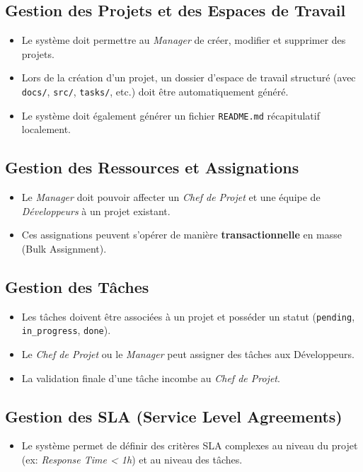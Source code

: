 \subsection{Gestion des Projets et des Espaces de Travail}
\begin{itemize}[leftmargin=*]
    \item Le syst\`{e}me doit permettre au \textit{Manager} de cr\'{e}er, modifier et supprimer des projets.
    \item Lors de la cr\'{e}ation d'un projet, un dossier d'espace de travail structur\'{e}
    (avec \texttt{docs/}, \texttt{src/}, \texttt{tasks/}, etc.) doit \^{e}tre automatiquement g\'{e}n\'{e}r\'{e}.
    \item Le syst\`{e}me doit \'{e}galement g\'{e}n\'{e}rer un fichier \texttt{README.md} r\'{e}capitulatif localement.
\end{itemize}

\subsection{Gestion des Ressources et Assignations}
\begin{itemize}[leftmargin=*]
    \item Le \textit{Manager} doit pouvoir affecter un \textit{Chef de Projet} et une \'{e}quipe de
    \textit{D\'{e}veloppeurs} \`{a} un projet existant.
    \item Ces assignations peuvent s'op\'{e}rer de mani\`{e}re \textbf{transactionnelle} en masse (Bulk Assignment).
\end{itemize}

\subsection{Gestion des T\^{a}ches}
\begin{itemize}[leftmargin=*]
    \item Les t\^{a}ches doivent \^{e}tre associ\'{e}es \`{a} un projet et poss\'{e}der un statut
    (\texttt{pending}, \texttt{in\_progress}, \texttt{done}).
    \item Le \textit{Chef de Projet} ou le \textit{Manager} peut assigner des t\^{a}ches aux D\'{e}veloppeurs.
    \item La validation finale d'une t\^{a}che incombe au \textit{Chef de Projet}.
\end{itemize}

\subsection{Gestion des SLA (Service Level Agreements)}
\begin{itemize}[leftmargin=*]
    \item Le syst\`{e}me permet de d\'{e}finir des crit\`{e}res SLA complexes au niveau du projet
    (ex: \textit{Response Time < 1h}) et au niveau des t\^{a}ches.
\end{itemize}

